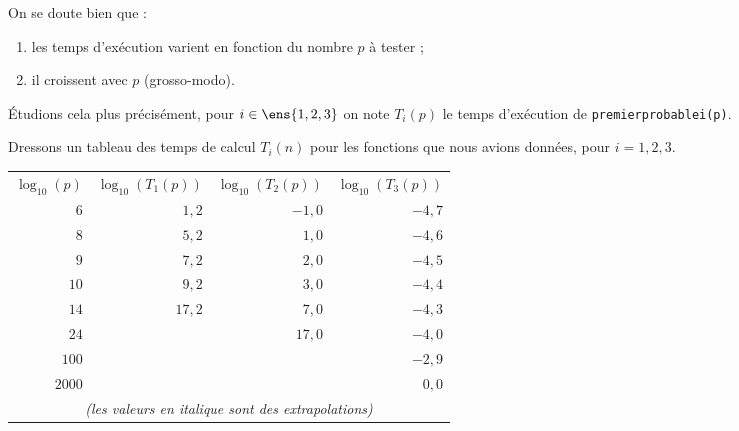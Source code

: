 On se doute bien que :
\begin{enumerate}
\item les temps d'exécution varient en fonction du nombre $p$ à tester ;
\item il croissent avec $p$ (grosso-modo).
\end{enumerate}

\'Etudions cela plus précisément, pour $i \in \ens{1,2,3}$ on note $T_i(p)$ le temps d'exécution de \lstinline{premierprobablei(p)}.



Dressons un tableau des temps de calcul $T_{i}(n)$ pour les fonctions
que nous avions données, pour $i=1, 2, 3$.

\begin{center}
\begin{tabular}{rrrr}
  $\log_{10}(p)$ & $\log_{10}(T_1(p))$& $\log_{10}(T_2(p))$ & $\log_{10}(T_3(p))$\\
$6$     & $1,2$         & $-1,0$        & $-4,7$\\
$8$     &$\mathit{5,2}$   & $1,0$         & $-4,6$\\
$9$     &$\mathit{7,2}$   & $\mathit{2,0}$  & $-4,5$\\
$10$    & $\mathit{9,2}$  & $\mathit{3,0}$  & $-4,4$\\
$14$    & $\mathit{17,2}$ & $\mathit{7,0}$  & $-4,3$\\
$24$    & %
                        & $\mathit{17,0}$ & $-4,0$\\
$100$ & & %
                        & $-2,9$\\
$2000$ & & & $0,0$\\
\multicolumn{4}{c}{\emph{(les valeurs en italique sont des extrapolations)}}\\
\end{tabular}
\end{center}

